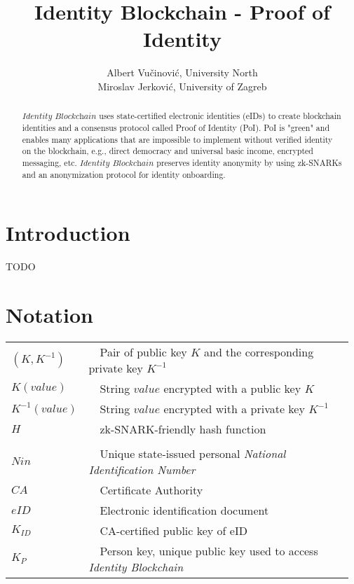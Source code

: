 \documentclass{article}
\title{Identity Blockchain - Proof of Identity}
\author{
Albert Vučinović, University North\\
Miroslav Jerković, University of Zagreb}
\newcommand{\khk}{K_{P}}
\newcommand{\kid}{K_{ID}}
\newcommand{\pbc}{\textit{Identity Blockchain}}
\begin{document}
\maketitle

\begin{abstract}
$\pbc$ uses state-certified electronic identities (eIDs) to create blockchain identities and a consensus protocol called Proof of Identity (PoI). PoI is "green" and enables many applications that are impossible to implement without verified identity on the blockchain, e.g., direct democracy and universal basic income, encrypted messaging, etc. $\pbc$ preserves identity anonymity by using zk-SNARKs and an anonymization protocol for identity onboarding.
\end{abstract}

\section{Introduction}
TODO

\section{Notation}
\vspace{10px}
\begin{tabular}{p{0.16\linewidth}| p{0.81\linewidth}}
  $(K, K^{-1})$ & \ \ Pair of public key $K$ and the corresponding private key $K^{-1}$ \\[3px]
	$K(value)$ & \ \ String $value$ encrypted with a public key $K$ \\[3px]
	$K^{-1}(value)$ & \ \ String $value$ encrypted with a private key $K^{-1}$ \\[3px]
  $H$ & \ \ zk-SNARK-friendly hash function \\[5px]
 \hline \\
   $Nin$ & \ \ Unique state-issued personal \textit{National Identification Number}\\[3px]
   $CA$ & \ \ Certificate Authority \\[3px]
   $eID$ & \ \ Electronic identification document \\[3px]
	$\kid$ & \ \ CA-certified public key of eID\\[3px]
  $\khk$ & \ \ Person key, unique public key used to access \pbc{}

\end{tabular}

\vspace{15px}
\end{document}
